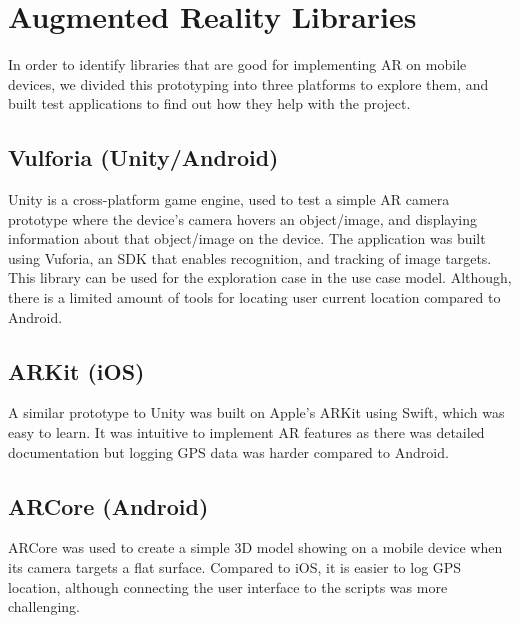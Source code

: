
\section{Augmented Reality Libraries}
In order to identify libraries that are good for implementing AR on mobile devices, we divided this prototyping into three platforms to explore them, and built test applications to find out how they help with the project.

\subsection*{Vulforia (Unity/Android)}
Unity is a cross-platform game engine, used to test a simple AR camera prototype where the device's camera hovers an object/image, and displaying information about that object/image on the device. The application was built using Vuforia, an SDK that enables recognition, and tracking of image targets. This library can be used for the exploration case in the use case model. Although, there is a limited amount of tools for locating user current location compared to Android.

\subsection*{ARKit (iOS)}
A similar prototype to Unity was built on Apple's ARKit using Swift, which was easy to learn. It was intuitive to implement AR features as there was detailed documentation but logging GPS data was harder compared to Android.

\subsection*{ARCore (Android)}
ARCore was used to create a simple 3D model showing on a mobile device when its camera targets a flat surface. Compared to iOS, it is easier to log GPS location, although connecting the user interface to the scripts was more challenging.

